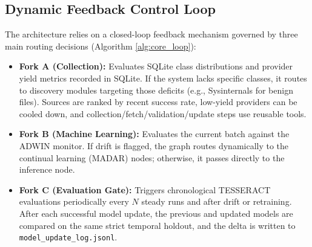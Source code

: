 \documentclass[letterpaper,10pt,conference]{ieeeconf}
\begin{document}
\subsection{Dynamic Feedback Control Loop}
The architecture relies on a closed-loop feedback mechanism governed by three main routing decisions (Algorithm \ref{alg:core_loop}):
\begin{itemize}
    \item \textbf{Fork A (Collection):} Evaluates SQLite class distributions and provider yield metrics recorded in SQLite. If the system lacks specific classes, it routes to discovery modules targeting those deficits (e.g., Sysinternals for benign files). Sources are ranked by recent success rate, low-yield providers can be cooled down, and collection/fetch/validation/update steps use reusable tools.

    \item \textbf{Fork B (Machine Learning):} Evaluates the current batch against the ADWIN monitor. If drift is flagged, the graph routes dynamically to the continual learning (MADAR) nodes; otherwise, it passes directly to the inference node.
    
    \item \textbf{Fork C (Evaluation Gate):} Triggers chronological TESSERACT evaluations periodically every $N$ steady runs and after drift or retraining. After each successful model update, the previous and updated models are compared on the same strict temporal holdout, and the delta is written to \texttt{model\_update\_log.jsonl}.

\end{itemize}
\end{document}

